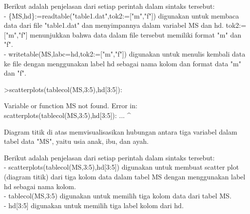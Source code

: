 \documentclass[a4paper,10pt]{article}
\begin{document}
\begin{eulernotebook}
\begin{eulercomment}
\begin{eulercomment}
\begin{eulercomment}
\begin{eulercomment}
\begin{eulercomment}
\begin{eulercomment}
\begin{eulercomment}
\begin{eulercomment}
\begin{eulercomment}
\begin{eulercomment}
\begin{eulercomment}
\begin{eulercomment}
\begin{eulercomment}
\begin{eulercomment}
\begin{eulercomment}
\begin{eulercomment}
\begin{eulercomment}
\begin{eulercomment}
\begin{eulercomment}
Berikut adalah penjelasan dari setiap perintah dalam sintaks tersebut:\\
- \{MS,hd\}:=readtable("table1.dat",tok2:=["m","f"]) digunakan untuk
membaca data dari file "table1.dat" dan menyimpannya dalam variabel MS
dan hd. tok2:=["m","f"] menunjukkan bahwa data dalam file tersebut
memiliki format "m" dan "f".\\
- writetable(MS,labc=hd,tok2:=["m","f"]) digunakan untuk menulis
kembali data ke file dengan menggunakan label hd sebagai nama kolom
dan format data "m" dan "f".
\end{eulercomment}
\begin{eulerprompt}
>scatterplots(tablecol(MS,3:5),hd[3:5]):
\end{eulerprompt}
\begin{euleroutput}
  Variable or function MS not found.
  Error in:
  scatterplots(tablecol(MS,3:5),hd[3:5]): ...
                          ^
\end{euleroutput}
\begin{eulercomment}
Diagram titik di atas  memvisualisasikan hubungan antara tiga variabel
dalam tabel data "MS", yaitu usia anak, ibu, dan ayah.

Berikut adalah penjelasan dari setiap perintah dalam sintaks tersebut:\\
- scatterplots(tablecol(MS,3:5),hd[3:5]) digunakan untuk membuat
scatter plot (diagram titik) dari tiga kolom data dalam tabel MS
dengan menggunakan label hd sebagai nama kolom.\\
- tablecol(MS,3:5) digunakan untuk memilih tiga kolom data dari tabel
MS.\\
- hd[3:5] digunakan untuk memilih tiga label kolom dari hd.


\end{eulercomment}
\end{eulercomment}
\end{eulercomment}
\end{eulercomment}
\end{eulercomment}
\end{eulercomment}
\end{eulercomment}
\end{eulercomment}
\end{eulercomment}
\end{eulercomment}
\end{eulercomment}
\end{eulercomment}
\end{eulercomment}
\end{eulercomment}
\end{eulercomment}
\end{eulercomment}
\end{eulercomment}
\end{eulercomment}
\end{eulercomment}
\end{eulernotebook}
\end{document}
